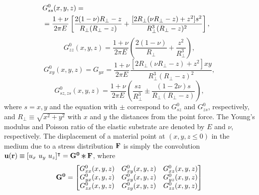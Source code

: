 \documentclass[aps,prl,reprint,twocolumn,groupedaddress,showpacs]{revtex4-1}
\def\r{{\bf r}}
\def\u{{\bf u}}
\def\F{{\bf F}}
\def\F{{\bf F}}
\newcommand{\Conv}{\mathop{\scalebox{1.5}{\raisebox{-0.2ex}{$\ast$}}}}%
\begin{document}
\begin{align}
\lefteqn{G^0_{ss}(x,y,z) = }\nonumber\\
&=\frac{1+\nu}{2\pi E}\left[\frac{2(1-\nu)R_{\perp}-z}{R_{\perp}(R_{\perp}-z)} + 
\frac{[2R_{\perp}(\nu R_{\perp}-z)+z^{2}]s^{2}}{R_{\perp}^{3}(R_{\perp}-z)^{2}}\right],
\end{align}
\begin{equation}
G^0_{zz}(x,y,z) =\frac{1+\nu}{2\pi E}\left(\frac{2(1-\nu)}{R_{\perp}}+\frac{z^{2}}{R_{\perp}^{3}}\right),
\end{equation}
\begin{equation} 
G^0_{xy}(x,y,z) = G_{yx}=\frac{1+\nu}{2\pi E}\frac{[2R_{\perp}(\nu R_{\perp}-z)+z^{2}]xy}{R_{\perp}^{3}
(R_{\perp}-z)^{2}},
\end{equation}
\begin{equation}
G^0_{sz, zs}(x,y,z) =\frac{1+\nu}{2\pi E}\left(\frac{sz}{R_{\perp}^{3}}\pm\frac{(1-2\nu)s}{R_{\perp}
(R_{\perp}-z)}\right),
\end{equation}
%
where $s=x,y$ and the equation with $\pm$ correspond to $G^0_{sz}$ and $G^0_{zs}$, respectively, 
and $R_{\perp} \equiv \sqrt{x^{2} +y^{2}}$ with $x$ and $y$ the distances from the 
point force. The Young's modulus and Poisson ratio of the elastic substrate are denoted by 
$E$ and $\nu$, respectively.   
The displacement of a material point at $(x,y,z\leq 0)$ in the medium due
to a stress distribution ${\bf F}$ is simply the convolution
$\u(\r) \equiv [u_x \ u_y\  u_z]^\intercal = {\bf G^0}\Conv\F$, where 
\begin{equation}
{\bf G^0} = \left[ \begin{matrix} G^0_{xx}(x,y,z) & G^0_{xy}(x,y,z) & G^0_{xz}(x,y,z) \\
	G^0_{yx}(x,y,z) & G^0_{xy}(x,y,z) & G^0_{yz}(x,y,z) \\
	G^0_{zx}(x,y,z) & G^0_{zy}(x,y,z) & G^0_{zz}(x,y,z) 
 \end{matrix} \right]
\end{equation}


\end{document}
